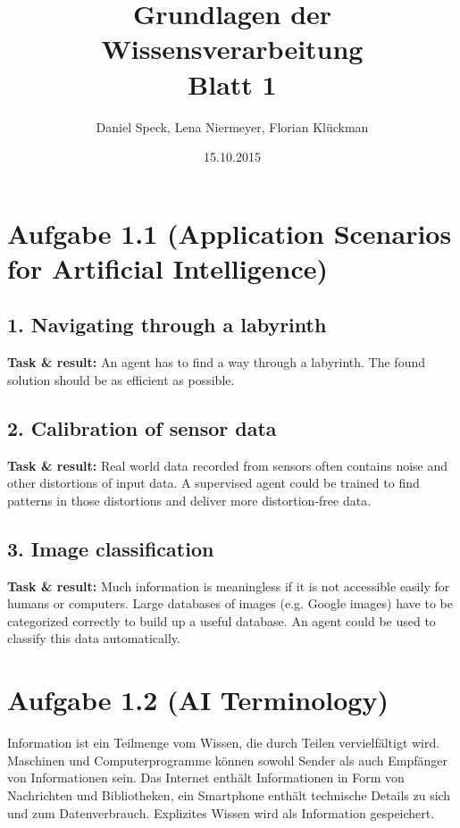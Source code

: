\documentclass[10pt,a4paper]{article}
\title{\textbf{\huge Grundlagen der Wissensverarbeitung
\\\Large Blatt 1}}
\author{Daniel Speck, Lena Niermeyer, Florian Klückman}
\date{15.10.2015}
\begin{document}
	\maketitle




	\section*{Aufgabe 1.1 (Application Scenarios for Artificial Intelligence)}
	
		\subsection*{1. Navigating through a labyrinth}
		
			\textbf{Task \& result:} An agent has to find a way through a labyrinth. The found solution should be as efficient as possible.
		
		\subsection*{2. Calibration of sensor data}
		
			\textbf{Task \& result:} Real world data recorded from sensors often contains noise and other distortions of input data. A supervised agent could be trained to find patterns in those distortions and deliver more distortion-free data.
		
		\subsection*{3. Image classification}
		
			\textbf{Task \& result:} Much information is meaningless if it is not accessible easily for humans or computers. Large databases of images (e.g. Google images) have to be categorized correctly to build up a useful database. An agent could be used to classify this data automatically.
	
	\section*{Aufgabe 1.2 (AI Terminology)}

Information ist ein Teilmenge vom Wissen, die durch Teilen vervielfältigt wird. Maschinen und Computerprogramme können sowohl Sender als auch Empfänger von Informationen sein. Das Internet enthält Informationen in Form von Nachrichten und Bibliotheken, ein Smartphone enthält technische Details zu sich und zum Datenverbrauch. Explizites Wissen wird als Information gespeichert.
\end{document}
